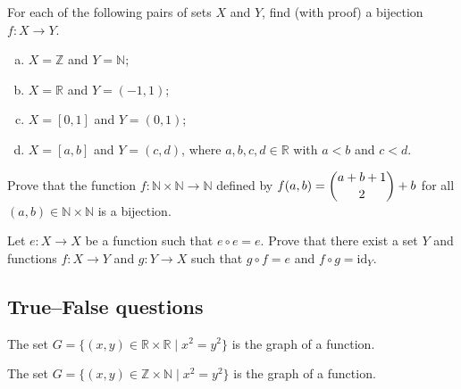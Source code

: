 \begin{chapex}
For each of the following pairs of sets $X$ and $Y$, find (with proof) a bijection $f : X \to Y$.
\begin{enumerate}[(a)]
\item $X = \mathbb{Z}$ and $Y = \mathbb{N}$;
\item $X = \mathbb{R}$ and $Y = (-1,1)$;
\item $X = [0,1]$ and $Y = (0,1)$;
\item $X = [a,b]$ and $Y = (c,d)$, where $a,b,c,d \in \mathbb{R}$ with $a<b$ and $c<d$.
\end{enumerate}
\end{chapex}

\begin{chapex}
Prove that the function $f : \mathbb{N} \times \mathbb{N} \to \mathbb{N}$ defined by $f(a,b) = \dbinom{a+b+1}{2} + b$ for all $(a,b) \in \mathbb{N} \times \mathbb{N}$ is a bijection.
\end{chapex}

\begin{chapex}
Let $e : X \to X$ be a function such that $e \circ e = e$. Prove that there exist a set $Y$ and functions $f : X \to Y$ and $g : Y \to X$ such that $g \circ f = e$ and $f \circ g = \mathrm{id}_Y$.
\end{chapex}

\subsection*{True--False questions}


\begin{chapex} %
\label{cqFunctionsTFBegin}
The set $G = \{ (x,y) \in \mathbb{R} \times \mathbb{R} \mid x^2=y^2 \}$ is the graph of a function.
\end{chapex}

\begin{chapex} %
The set $G = \{ (x,y) \in \mathbb{Z}\times \mathbb{N} \mid x^2=y^2 \}$ is the graph of a function.
\end{chapex}

